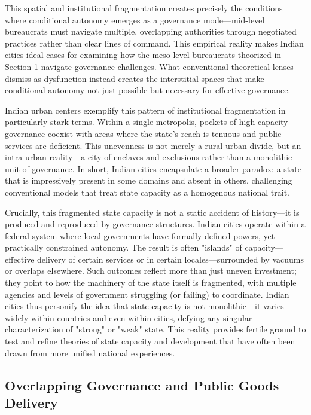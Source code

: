 This spatial and institutional fragmentation creates precisely the conditions where conditional autonomy emerges as a governance mode—mid-level bureaucrats must navigate multiple, overlapping authorities through negotiated practices rather than clear lines of command. This empirical reality makes Indian cities ideal cases for examining how the meso-level bureaucrats theorized in Section 1 navigate governance challenges. What conventional theoretical lenses dismiss as dysfunction instead creates the interstitial spaces that make conditional autonomy not just possible but necessary for effective governance.

Indian urban centers exemplify this pattern of institutional fragmentation in particularly stark terms. Within a single metropolis, pockets of high-capacity governance coexist with areas where the state's reach is tenuous and public services are deficient. This unevenness is not merely a rural-urban divide, but an intra-urban reality—a city of enclaves and exclusions rather than a monolithic unit of governance. In short, Indian cities encapsulate a broader paradox: a state that is impressively present in some domains and absent in others, challenging conventional models that treat state capacity as a homogenous national trait.

Crucially, this fragmented state capacity is not a static accident of history—it is produced and reproduced by governance structures. Indian cities operate within a federal system where local governments have formally defined powers, yet practically constrained autonomy. The result is often "islands" of capacity—effective delivery of certain services or in certain locales—surrounded by vacuums or overlaps elsewhere. Such outcomes reflect more than just uneven investment; they point to how the machinery of the state itself is fragmented, with multiple agencies and levels of government struggling (or failing) to coordinate. Indian cities thus personify the idea that state capacity is not monolithic—it varies widely within countries and even within cities, defying any singular characterization of "strong" or "weak" state. This reality provides fertile ground to test and refine theories of state capacity and development that have often been drawn from more unified national experiences.



\subsection{Overlapping Governance and Public Goods Delivery}

